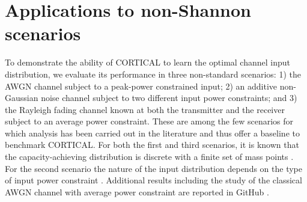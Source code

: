 \section{Applications to non-Shannon scenarios}
\label{sec:cortical_results}
To demonstrate the ability of CORTICAL to learn the optimal channel input distribution, we evaluate its performance in three non-standard scenarios: 1) the AWGN channel subject to a peak-power constrained input; 2) an additive non-Gaussian noise channel subject to two different input power constraints; and 3) the Rayleigh fading channel known at both the transmitter and the receiver subject to an average power constraint. These are among the few scenarios for which analysis has been carried out in the literature and thus offer a baseline to benchmark CORTICAL. For both the first and third scenarios, it is known that the capacity-achieving distribution is discrete with a finite set of mass points \cite{Smith1971,Tchamkerten2004,Dytso2020}. For the second scenario the nature of the input distribution depends on the type of input power constraint \cite{Fahs2014}. Additional results including the study of the classical AWGN channel with average power constraint are reported in GitHub \cite{CORTICAL_github}.

